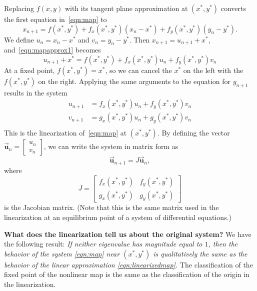 \documentclass[reqno]{immbook}
\newcommand{\BU}{\vec{\textbf{u}}}
\numberwithin{equation}{chapter}
\numberwithin{question}{section}
\numberwithin{theorem}{chapter}
\numberwithin{figure}{chapter}
\theoremstyle{definition}
\begin{document}
Replacing $f(x,y)$ with its tangent plane
approximation at $(x^*,y^*)$ converts the first equation in~\eqref{eqn:map}
to
\begin{equation}
  x_{n+1} = f(x^*,y^*) + f_x(x^*,y^*)(x_n-x^*) + f_y(x^*,y^*)(y_n-y^*).
\label{eqn:mapapprox1}
\end{equation}
We define $u_n = x_n - x^*$ and
$v_n = y_n - y^*$.  Then $x_{n+1} = u_{n+1} + x^*$, and~\eqref{eqn:mapapprox1}
becomes
\begin{equation}
   u_{n+1} + x^* = f(x^*,y^*) + f_x(x^*,y^*)u_n + f_y(x^*,y^*)v_n
\end{equation}
At a fixed point, $f(x^*,y^*) = x^*$, so we can cancel the $x^*$ on the
left with the $f(x^*,y^*)$ on the right.  Applying the same arguments
to the equation for $y_{n+1}$ results in the system
\begin{equation}
\begin{split}
   u_{n+1} & = f_x(x^*,y^*)u_n + f_y(x^*,y^*)v_n \\
   v_{n+1} & = g_x(x^*,y^*)u_n + g_y(x^*,y^*)v_n \\
\end{split}
\end{equation}
This is the linearization
of~\eqref{eqn:map} at $(x^*,y^*)$.
By defining the vector $\BU_n = \begin{bmatrix} u_n \\ v_n \end{bmatrix}$,
we can write the system in matrix form as
\begin{equation}
  \BU_{n+1} = J\BU_n,
\label{eqn:linearizedmap}
\end{equation}
where
\begin{equation}
   J = \begin{bmatrix}
             f_x(x^*,y^*) & f_y(x^*,y^*) \\
	     g_x(x^*,y^*) & g_y(x^*,y^*)
       \end{bmatrix}
\label{eqn:mapjac}
\end{equation}
is the Jacobian matrix.
(Note that this is the same matrix used in the linearization
at an equilibrium point of a system of differential equations.)

\noindent
\textbf{What does the linearization tell us about the original system?}
We have the following result:
\emph{If neither eigenvalue has magnitude equal to $1$,
then the behavior of the system \eqref{eqn:map}
near $(x^*,y^*)$ is qualitatively the same as the behavior of the
linear approximation \eqref{eqn:linearizedmap}.}
The classification of the fixed point of the nonlinear map
is the same as the classification of the origin in the linearization.
\end{document}
